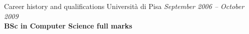 \documentclass{resume}
\begin{document}
\begin{rSection}{Career history and qualifications}
		Universit\`a di Pisa \hfill {\em September 2006 -- October 2009} \\
		{\bf BSc in Computer Science full marks}
	\end{rSection}
\end{document}
